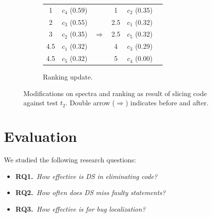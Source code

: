 \documentclass{article}
\begin{document}
\begin{figure}[t!]
  \vspace{2ex}

  \begin{subfigure}{0.5\textwidth}
    \centering
    \begin{tabular}{cccccc}
      {\cellcolor{Gray}1} & {\cellcolor{Gray}$c_4$ (0.59)} & & 1 & $c_2$ (0.35) \\
      {\cellcolor{Gray}2} & {\cellcolor{Gray}$c_3$ (0.55)} & & 2.5 & $c_1$ (0.32)\\
      3 & $c_2$ (0.35) & \hspace{1ex}$\Rightarrow$\hspace{1ex} & 2.5 & $c_5$ (0.32)\\
      4.5 & $c_1$ (0.32) & & {\cellcolor{Gray}4} & {\cellcolor{Gray}$c_3$ (0.29)}\\
      4.5 & $c_5$ (0.32) & & {\cellcolor{Gray}5} & {\cellcolor{Gray}$c_4$ (0.00)}\\
    \end{tabular}
    \caption{Ranking update.}
  \end{subfigure}

  \caption{Modifications on spectra and ranking as result of slicing
    code against test $t_2$. Double arrow ($\Rightarrow$) indicates
    before and after.}
  \label{fig:illustration}
  \vspace{-2ex}
\end{figure}

%
\section{Evaluation}
\label{sec:eval}

We studied the following research questions:


\newcommand{\rqone}{How effective is DS in eliminating code?}
\newcommand{\rqtwo}{How often does DS miss faulty statements?}
\newcommand{\rqthree}{How effective is \comb{} for bug localization?}

\begin{itemize}[leftmargin=0em]
\item[]{\textbf{RQ1.}}~\textit{\rqone{}}
\item[]{\textbf{RQ2.}}~\textit{\rqtwo{}}
\item[]{\textbf{RQ3.}}~\textit{\rqthree{}}
\end{itemize}
\end{document}
